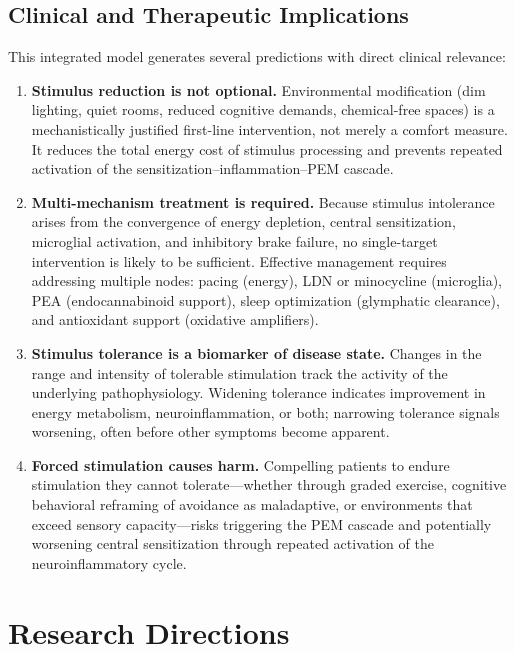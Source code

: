 \subsection{Clinical and Therapeutic Implications}

This integrated model generates several predictions with direct clinical relevance:

\begin{enumerate}
  \item \textbf{Stimulus reduction is not optional.} Environmental modification (dim lighting, quiet rooms, reduced cognitive demands, chemical-free spaces) is a mechanistically justified first-line intervention, not merely a comfort measure. It reduces the total energy cost of stimulus processing and prevents repeated activation of the sensitization--inflammation--PEM cascade.

  \item \textbf{Multi-mechanism treatment is required.} Because stimulus intolerance arises from the convergence of energy depletion, central sensitization, microglial activation, and inhibitory brake failure, no single-target intervention is likely to be sufficient. Effective management requires addressing multiple nodes: pacing (energy), LDN or minocycline (microglia), PEA (endocannabinoid support), sleep optimization (glymphatic clearance), and antioxidant support (oxidative amplifiers).

  \item \textbf{Stimulus tolerance is a biomarker of disease state.} Changes in the range and intensity of tolerable stimulation track the activity of the underlying pathophysiology. Widening tolerance indicates improvement in energy metabolism, neuroinflammation, or both; narrowing tolerance signals worsening, often before other symptoms become apparent.

  \item \textbf{Forced stimulation causes harm.} Compelling patients to endure stimulation they cannot tolerate---whether through graded exercise, cognitive behavioral reframing of avoidance as maladaptive, or environments that exceed sensory capacity---risks triggering the PEM cascade and potentially worsening central sensitization through repeated activation of the neuroinflammatory cycle.
\end{enumerate}


\section{Research Directions}
\label{sec:ch15-research-directions}

